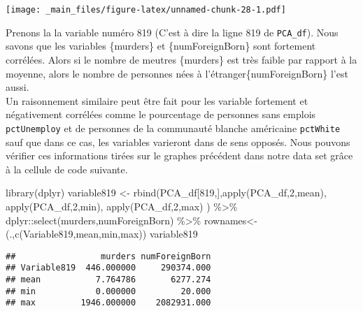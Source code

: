 \documentclass[
]{book}
\newenvironment{Shaded}{\begin{snugshade}}{\end{snugshade}}
\newcommand{\AttributeTok}[1]{\textcolor[rgb]{0.77,0.63,0.00}{#1}}
\newcommand{\DecValTok}[1]{\textcolor[rgb]{0.00,0.00,0.81}{#1}}
\newcommand{\FunctionTok}[1]{\textcolor[rgb]{0.00,0.00,0.00}{#1}}
\newcommand{\NormalTok}[1]{#1}
\newcommand{\OtherTok}[1]{\textcolor[rgb]{0.56,0.35,0.01}{#1}}
\newcommand{\SpecialCharTok}[1]{\textcolor[rgb]{0.00,0.00,0.00}{#1}}
\newcommand{\StringTok}[1]{\textcolor[rgb]{0.31,0.60,0.02}{#1}}
\begin{document}
\texttt{[image: \_main\_files/figure-latex/unnamed-chunk-28-1.pdf]}

Prenons la la variable numéro 819 (C'est à dire la ligne 819 de \texttt{PCA\_df}). Nous savons que les variables \{murders\} et \{numForeignBorn\} sont fortement corrélées. Alors si le nombre de meutres \{murders\} est très faible par rapport à la moyenne, alors le nombre de personnes nées à l'étranger\{numForeignBorn\} l'est aussi.\\

Un raisonnement similaire peut être fait pour les variable fortement et négativement corrélées comme le pourcentage de personnes sans emplois \texttt{pctUnemploy} et de personnes de la communauté blanche américaine \texttt{pctWhite} sauf que dans ce cas, les variables varieront dans de sens opposés.
Nous pouvons vérifier ces informations tirées sur le graphes précédent dans notre data set grâce à la cellule de code suivante.

\begin{Shaded}
\begin{Highlighting}[]
\FunctionTok{library}\NormalTok{(dplyr)}
\NormalTok{variable819 }\OtherTok{\textless{}{-}} \FunctionTok{rbind}\NormalTok{(PCA\_df[}\DecValTok{819}\NormalTok{,],}\FunctionTok{apply}\NormalTok{(PCA\_df,}\DecValTok{2}\NormalTok{,mean),}
                   \FunctionTok{apply}\NormalTok{(PCA\_df,}\DecValTok{2}\NormalTok{,min),}
                   \FunctionTok{apply}\NormalTok{(PCA\_df,}\DecValTok{2}\NormalTok{,max)}
\NormalTok{                   ) }\SpecialCharTok{\%\textgreater{}\%}\NormalTok{  dplyr}\SpecialCharTok{::}\FunctionTok{select}\NormalTok{(murders,numForeignBorn) }\SpecialCharTok{\%\textgreater{}\%} 
                     \StringTok{\textasciigrave{}}\AttributeTok{rownames\textless{}{-}}\StringTok{\textasciigrave{}}\NormalTok{(.,}\FunctionTok{c}\NormalTok{(}\StringTok{\textquotesingle{}Variable819\textquotesingle{}}\NormalTok{,}\StringTok{\textquotesingle{}mean\textquotesingle{}}\NormalTok{,}\StringTok{\textquotesingle{}min\textquotesingle{}}\NormalTok{,}\StringTok{\textquotesingle{}max\textquotesingle{}}\NormalTok{))}
\NormalTok{variable819}
\end{Highlighting}
\end{Shaded}

\begin{verbatim}
##                 murders numForeignBorn
## Variable819  446.000000     290374.000
## mean           7.764786       6277.274
## min            0.000000         20.000
## max         1946.000000    2082931.000
\end{verbatim}
\end{document}
